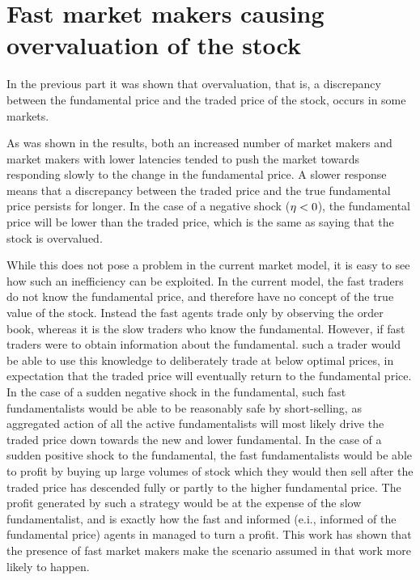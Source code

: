 \section{Fast market makers causing overvaluation of the stock}
In the previous part it was shown that overvaluation, that is, a discrepancy between the fundamental price and the traded price of the stock, occurs in some markets. 

As was shown in the results, both an increased number of market makers and market makers with lower latencies tended to push the market towards responding slowly to the change in the fundamental price. A slower response means that a discrepancy between the traded price and the true fundamental price persists for longer. In the case of a negative shock ($\eta < 0$), the fundamental price will be lower than the traded price, which is the same as saying that the stock is overvalued.

While this does not pose a problem in the current market model, it is easy to see how such an inefficiency can be exploited. In the current model, the fast traders do not know the fundamental price, and therefore have no concept of the true value of the stock. Instead the fast agents trade only by observing the order book, whereas it is the slow traders who know the fundamental. However, if fast traders were to obtain information about the fundamental. such a trader would be able to use this knowledge to deliberately trade at below optimal prices, in expectation that the traded price will eventually return to the fundamental price. In the case of a sudden negative shock in the fundamental, such fast fundamentalists would be able to be reasonably safe by short-selling, as aggregated action of all the active fundamentalists will most likely drive the traded price down towards the new and lower fundamental. In the case of a sudden positive shock to the fundamental, the fast fundamentalists would be able to profit by buying up large volumes of stock which they would then sell after the traded price has descended fully or partly to the higher fundamental price. The profit generated by such a strategy would be at the expense of the slow fundamentalist, and is exactly how the fast and informed (e.i., informed of the fundamental price) agents in \cite{} managed to turn a profit. This work has shown that the presence of fast market makers make the scenario assumed in that work more likely to happen.

